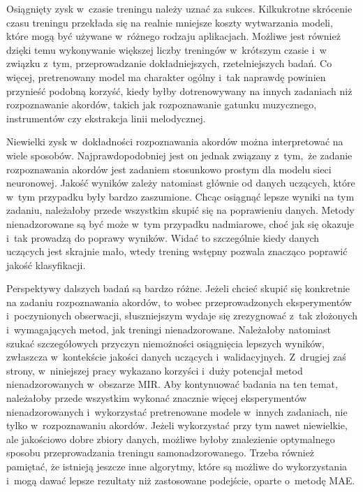 Osiągnięty zysk w~czasie treningu należy uznać za sukces. Kilkukrotne skrócenie czasu treningu przekłada się na realnie mniejsze koszty wytwarzania modeli, które mogą być używane w~różnego rodzaju aplikacjach. Możliwe jest również dzięki temu wykonywanie większej liczby treningów w~krótszym czasie i~w związku z~tym, przeprowadzanie dokładniejszych, rzetelniejszych badań. Co więcej, pretrenowany model ma charakter ogólny i~tak naprawdę powinien przynieść podobną korzyść, kiedy byłby dotrenowywany na innych zadaniach niż rozpoznawanie akordów, takich jak rozpoznawanie gatunku muzycznego, instrumentów czy ekstrakcja linii melodycznej.

Niewielki zysk w~dokładności rozpoznawania akordów można interpretować na wiele sposobów. Najprawdopodobniej jest on jednak związany z~tym, że zadanie rozpoznawania akordów jest zadaniem stosunkowo prostym dla modelu sieci neuronowej. Jakość wyników zależy natomiast głównie od danych uczących, które w~tym przypadku były bardzo zaszumione. Chcąc osiągnąć lepsze wyniki na tym zadaniu, należałoby przede wszystkim skupić się na poprawieniu danych. Metody nienadzorowane są być może w~tym przypadku nadmiarowe, choć jak się okazuje i~tak prowadzą do poprawy wyników. Widać to szczególnie kiedy danych uczących jest skrajnie mało, wtedy trening wstępny pozwala znacząco poprawić jakość klasyfikacji.

Perspektywy dalszych badań są bardzo różne. Jeżeli chcieć skupić się konkretnie na zadaniu rozpoznawania akordów, to wobec przeprowadzonych eksperymentów i~poczynionych obserwacji, słuszniejszym wydaje się zrezygnować z~tak złożonych i~wymagających metod, jak treningi nienadzorowane. Należałoby natomiast szukać szczegółowych przyczyn niemożności osiągnięcia lepszych wyników, zwłaszcza w~kontekście jakości danych uczących i~walidacyjnych. Z~drugiej zaś strony, w~niniejszej pracy wykazano korzyści i~duży potencjał metod nienadzorowanych w~obszarze MIR. Aby kontynuować badania na ten temat, należałoby przede wszystkim wykonać znacznie więcej eksperymentów nienadzorowanych i~wykorzystać pretrenowane modele w~innych zadaniach, nie tylko w~rozpoznawaniu akordów. Jeżeli wykorzystać przy tym nawet niewielkie, ale jakościowo dobre zbiory danych, możliwe byłoby znalezienie optymalnego sposobu przeprowadzania treningu samonadzorowanego. Trzeba również pamiętać, że istnieją jeszcze inne algorytmy, które są możliwe do wykorzystania i~mogą dawać lepsze rezultaty niż zastosowane podejście, oparte o~metodę MAE.
